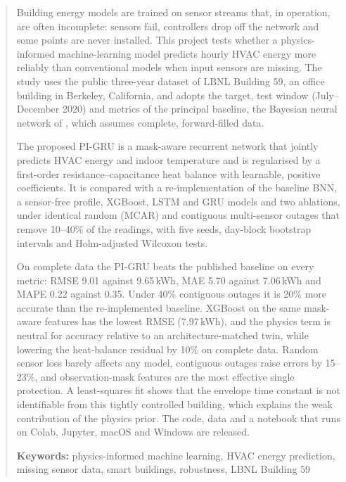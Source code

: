 \begin{abstract}
Building energy models are trained on sensor streams that, in operation, are often incomplete: sensors fail, controllers drop off the network and some points are never installed. This project tests whether a physics-informed machine-learning model predicts hourly HVAC energy more reliably than conventional models when input sensors are missing. The study uses the public three-year dataset of LBNL Building 59, an office building in Berkeley, California, and adopts the target, test window (July--December 2020) and metrics of the principal baseline, the Bayesian neural network of \citet{mahajan2024bnn}, which assumes complete, forward-filled data.

The proposed PI-GRU is a mask-aware recurrent network that jointly predicts HVAC energy and indoor temperature and is regularised by a first-order resistance--capacitance heat balance with learnable, positive coefficients. It is compared with a re-implementation of the baseline BNN, a sensor-free profile, XGBoost, LSTM and GRU models and two ablations, under identical random (MCAR) and contiguous multi-sensor outages that remove 10--40\% of the readings, with five seeds, day-block bootstrap intervals and Holm-adjusted Wilcoxon tests.

On complete data the PI-GRU beats the published baseline on every metric: RMSE 9.01 against 9.65\,kWh, MAE 5.70 against 7.06\,kWh and MAPE 0.22 against 0.35. Under 40\% contiguous outages it is 20\% more accurate than the re-implemented baseline. XGBoost on the same mask-aware features has the lowest RMSE (7.97\,kWh), and the physics term is neutral for accuracy relative to an architecture-matched twin, while lowering the heat-balance residual by 10\% on complete data. Random sensor loss barely affects any model, contiguous outages raise errors by 15--23\%, and observation-mask features are the most effective single protection. A least-squares fit shows that the envelope time constant is not identifiable from this tightly controlled building, which explains the weak contribution of the physics prior. The code, data and a notebook that runs on Colab, Jupyter, macOS and Windows are released.

\medskip
\textbf{Keywords:} physics-informed machine learning, HVAC energy prediction, missing sensor data, smart buildings, robustness, LBNL Building 59
\end{abstract}
